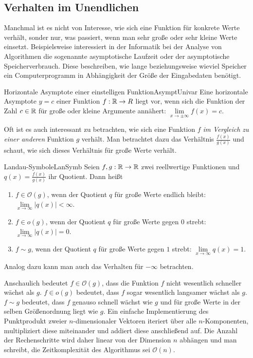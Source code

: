 \subsection{Verhalten im Unendlichen}

Manchmal ist es nicht von Interesse, wie sich eine Funktion für konkrete Werte verhält, sonder nur, was passiert, wenn man sehr große oder sehr kleine Werte einsetzt. Beispielsweise interessiert in der Informatik bei der Analyse von Algorithmen die sogenannte asymptotische Laufzeit oder der asymptotische Speicherverbrauch. Diese beschreiben, wie lange beziehungsweise wieviel Speicher ein Computerprogramm in Abhängigkeit der Größe der Eingabedaten benötigt.

\begin{definition}{Horizontale Asymptote einer einstelligen Funktion}{AsymptUnivar}
    Eine horizontale Asymptote $y=c$ einer Funktion $f: \mathbb{R} \to R$ liegt vor, wenn sich die Funktion der Zahl $c\in\mathbb{R}$ für große oder kleine Argumente annähert: $\lim\limits_{x\to\pm\infty} f(x) = c$.
\end{definition}

Oft ist es auch interessant zu betrachten, wie sich eine Funktion $f$ \emph{im Vergleich zu einer anderen} Funktion $g$ verhält. Man betrachtet dazu das Verhältnis $\frac{f(x)}{g(x)}$ und schaut, wie sich dieses Verhältnis für große Werte verhält.

\begin{definition}{Landau-Symbole}{LanSymb}
    Seien $f,g: \mathbb{R} \to \mathbb{R}$ zwei reellwertige Funktionen und $q(x) = \frac{f(x)}{g(x)}$ ihr Quotient. Dann heißt
    \begin{enumerate}
        \item $f \in \mathcal{O}(g)$, wenn der Quotient $q$ für große Werte endlich bleibt: $\lim\limits_{x\to\infty} |q(x)| < \infty$.
        \item $f \in o(g)$, wenn der Quotient $q$ für große Werte gegen $0$ strebt: $\lim\limits_{x\to\infty} |q(x)| = 0$.
        \item $f \sim g$, wenn der Quotient $q$ für große Werte gegen $1$ strebt: $\lim\limits_{x\to\infty} q(x) = 1$.
    \end{enumerate}
    Analog dazu kann man auch das Verhalten für $-\infty$ betrachten.
\end{definition}

Anschaulich bedeutet $f \in \mathcal{O}(g)$, dass die Funktion $f$ nicht wesentlich schneller wächst als $g$. $f \in o(g)$ bedeutet, dass $f$ sogar wesentlich langsamer wächst als $g$. $f \sim g$ bedeutet, dass $f$ genauso schnell wächst wie $g$ und für große Werte in der selben Größenordnung liegt wie $g$. Ein einfache Implementierung des Punktprodukt zweier $n$-dimensionaler Vektoren iteriert über alle $n$-Komponenten, multipliziert diese miteinander und addiert diese anschließend auf. Die Anzahl der Rechenschritte wird daher linear von der Dimension $n$ abhängen und man schreibt, die Zeitkomplexität des Algorithmus sei $\mathcal{O}(n)$.

